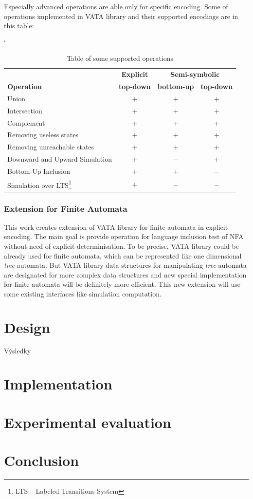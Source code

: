 Especially advanced operations are able only for specific encoding. Some of operations implemented in VATA library and their supported encodings are in this table:
\begin{savenotes}
\begin{table}[h]
	\begin{center}
		\catcode`
		\begin{tabular}{| l | c | c | c |} \hline
		& {\textbf{Explicit}} & \multicolumn{2}{|c|}{\textbf{Semi-symbolic}} \\ \cline{2-4}
		\textbf{Operation} & \textbf{top-down} & \textbf{bottom-up} & \textbf{top-down} \\ \hline
		Union & $+$ & $+$ & $+$ \\
		Intersection & $+$ & $+$ & $+$ \\
		Complement & $+$ & $+$ & $+$ \\
		Removing useless states & $+$ & $+$ & $+$ \\
		Removing unreachable states & $+$ & $+$ & $+$ \\
		Downward and Upward Simulation & $+$ & $-$ & $+$ \\
		Bottom-Up Inclusion  & $+$ & $+$ & $-$ \\ 
		Simulation over LTS\footnote{LTS -- Labeled Transitions System} & $+$ & $-$ & $-$ \\ \hline
		\end{tabular}
	\caption{Table of some supported operations}
	\label{tab1}
	\end{center}
\end{table}
\end{savenotes}


\subsection{Extension for Finite Automata}
This work creates extension of VATA library for finite automata in explicit encoding. The main goal is provide operation for language inclusion test of
NFA without need of explicit determinisation. To be precise, VATA library could be already used for finite automata, 
which can be represented like one dimensional
\emph{tree} automata. But VATA library data structures for manipulating \emph{tree} automata are designated for more complex data structures
and new special implementation for finite
automata will be definitely more efficient. This new extension will use some existing interfaces like simulation computation.

\chapter{Design}
\label{arch}Výsledky

\chapter{Implementation}
\label{implementation}

\chapter{Experimental evaluation}
\label{eval}
\chapter{Conclusion}
\label{concl}
